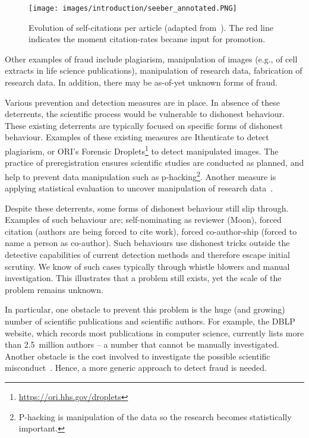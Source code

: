 \documentclass{ou-report}
\newcommand{\HJ}[1]{{\color{red} HJ: #1}}
\begin{document}
\begin{figure}[H]
\centering
\texttt{[image: images/introduction/seeber\_annotated.PNG]}
\caption{Evolution of self-citations per article (adapted from~\cite{SEEBER2019478}).
    The red line indicates the moment citation-rates became input for promotion.}
\label{fig:seeber}
\end{figure}

Other examples of fraud include plagiarism, manipulation  of images
(e.g., of cell extracts in life science publications), manipulation of research
data, fabrication of research data. In addition, there may be as-of-yet unknown
forms of fraud.

Various prevention and detection measures are in place. In absence of these 
deterrents, the scientific process would be vulnerable to dishonest behaviour. 
These existing deterrents are typically focused on specific forms of dishonest 
behaviour. Examples of these existing measures are Ithenticate to detect 
plagiarism, or ORI's Forensic
Droplets\footnote{\url{https://ori.hhs.gov/droplets}} 
to detect manipulated images. The practice of preregistration ensures scientific
studies are conducted as planned, and help to prevent data manipulation such as 
p-hacking\footnote{P-hacking is manipulation of the data so the research becomes
statistically important.}. Another measure is applying statistical evaluation to
uncover manipulation of research data~\cite{HGWA2019}. 

Despite these deterrents, some forms of dishonest behaviour still slip through.
Examples of such behaviour are;
self-nominating as reviewer (Moon), forced citation (authors are being forced
to cite work), forced co-author-ship (forced to name a person as co-author).
Such behaviours use dishonest tricks outside the detective capabilities of
current detection methods and therefore escape initial scrutiny. We know of
such cases typically through whistle blowers and manual investigation. 
This illustrates that a problem still exists, yet the scale of the
problem remains unknown.

In particular, one obstacle to prevent this problem is the huge (and growing) 
number of scientific 
publications and scientific authors. For example, the DBLP website, which 
records most publications in computer science, currently lists more than 
2.5~million authors -- a number that cannot be manually investigated. 
Another obstacle is the cost involved to investigate the possible scientific 
misconduct~\cite{MHWT2010}.
Hence, a more generic approach to detect fraud is needed. 
\end{document}
